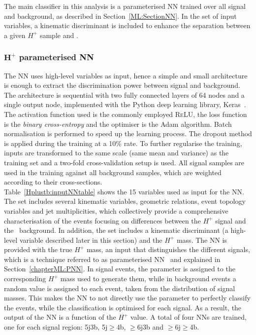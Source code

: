 The main classifier in this analysis is a parameterised NN trained over all signal and background, as described in Section~\ref{ML:SectionNN}. In the set of input variables, a kinematic discriminant is included to enhance the separation between a given $H^+$ sample and \ttjets.

\subsubsection{$\bm{H^+}$ parameterised NN}
\label{sec:HplusPNN}
The NN uses high-level variables as input, hence a simple and small architecture is enough to extract the discrimination power between signal and background. The architecture is sequential with two fully connected layers of 64 nodes and a single output node, implemented with the Python deep learning library, Keras~\cite{chollet2015keras}. The activation function used is the commonly employed \textsc{ReLU}, the loss function is the \textit{binary cross-entropy} and the optimiser is the Adam algorithm. Batch normalisation is performed to speed up the learning process. The dropout method is applied during the training at a 10\% rate. To further regularise the training, inputs are transformed to the same scale (same mean and variance) as the training set and a two-fold cross-validation setup is used. All signal samples are used in the training against all background samples, which are weighted according to their cross-sections.\\

Table~\ref{Hplustb:inputNNtable} shows the 15 variables used as input for the NN. The set includes several kinematic variables, geometric relations, event topology variables and jet multiplicities, which collectively provide a comprehensive characterisation of the events focusing on differences between the $H^+$ signal and the \ttbar\ background. In addition, the set includes a kinematic discriminant (a high-level variable described later in this section) and the $H^+$ mass. The NN is provided with the true $H^+$ mass, an input that distinguishes the different signals, which is a technique referred to as parameterised NN~\cite{Baldi_2016} and explained in Section~\ref{chapterML:PNN}. In signal events, the parameter is assigned to the corresponding $H^+$ mass used to generate them, while in background events a random value is assigned to each event, taken from the distribution of signal masses. This makes the NN to not directly use the parameter to perfectly classify the events, while the classification is optimised for each signal. As a result, the output of the NN is a function of the $H^+$ value. A total of four NNs are trained, one for each signal region: 5j3b, 5j$\geq$4b, $\geq$6j3b and $\geq$6j$\geq$4b.\\

